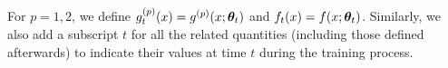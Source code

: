 




For $p=1,2$, we define $g^{(p)}_t(x) = g^{(p)}(x;\bm{\theta}_t)$ and $f_t(x) = f(x;\bm{\theta}_t)$.
Similarly, we also add a subscript $t$ for all the related quantities (including those defined afterwards) to indicate their values at time $t$ during the training process.


